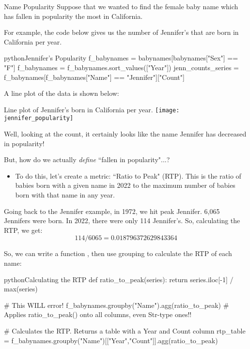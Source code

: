\documentclass[openany]{book}
\begin{document}
\begin{casestudy*}[parbox=false]{Name Popularity}{}
Suppose that we wanted to find the female baby name which has fallen in popularity the most in California.

For example, the code below gives us the number of Jennifer's that are born in California per year.
\begin{code}{python}{Jennifer's Popularity}
f_babynames = babynames[babynames["Sex"] == "F"]
f_babynames = f_babynames.sort_values(["Year"])
jenn_counts_series = f_babynames[f_babynames["Name"] == "Jennifer"]["Count"]
\end{code}

A line plot of the data is shown below:
\begin{figurebox}[nofloat]{Line plot of Jennifer's born in California per year.}
	\centering\texttt{[image: jennifer\_popularity]}
\end{figurebox}

Well, looking at the count, it certainly looks like the name Jennifer has decreased in popularity!

But, how do we actually \textit{define} ``fallen in popularity"...?
\begin{itemize}
	\item To do this, let's create a metric: ``Ratio to Peak" (RTP). This is the ratio of babies born with a given name in 2022 to the maximum number of babies born with that name in any year. 
\end{itemize}

Going back to the Jennifer example, in 1972, we hit peak Jennifer. 6,065 Jennifers were born. In 2022, there were only 114 Jennifer's. So, calculating the RTP, we get:
\begin{equation*}
	114/6065 = 0.018796372629843364
\end{equation*}

So, we can write a function , then use grouping to calculate the RTP of each name:
\begin{code}{python}{Calculating the RTP}
def ratio_to_peak(series):
  return series.iloc[-1] / max(series)

# This WILL error!
f_babynames.groupby("Name").agg(ratio_to_peak) # Applies ratio_to_peak() onto all columns, even Str-type ones!!

# Calculates the RTP. Returns a table with a Year and Count column
rtp_table = f_babynames.groupby("Name")[["Year","Count"]].agg(ratio_to_peak)


\end{code}
\end{casestudy*}
\end{document}
